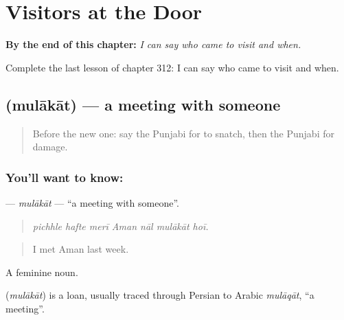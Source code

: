 
\chapter{Visitors at the Door}
\label{ch:pa-a2-visitors-at-the-door}

\begin{chapteropening}
\textbf{By the end of this chapter:} \emph{I can say who came to visit and when.}

Complete the last lesson of chapter 312: I can say who came to visit and when.
\end{chapteropening}

\section[\texorpdfstring{\pa{ਮੁਲਾਕਾਤ} (mulākāt)}{ਮੁਲਾਕਾਤ (mulākāt)}]{ (mulākāt) — a meeting with someone}

\label{lesson:PA-C312-mulakat}



\begin{quote}
Before the new one: say the Punjabi for to snatch, then the Punjabi for damage.
\end{quote}

\subsection*{You'll want to know: }
\textbf{} — \emph{mulākāt} — \textquotedblleft{}a meeting with someone\textquotedblright{}.

\begin{quote}
      
\end{quote}

\begin{quote}
\emph{pichhle hafte merī Aman nāl mulākāt hoī.}
\end{quote}

\begin{quote}
I met Aman last week.
\end{quote}

A feminine noun.

\begin{cousinweb}
\textbf{} (\emph{mulākāt}) is a loan, usually traced through Persian to Arabic \emph{mulāqāt}, \textquotedblleft{}a meeting\textquotedblright{}.
\end{cousinweb}

